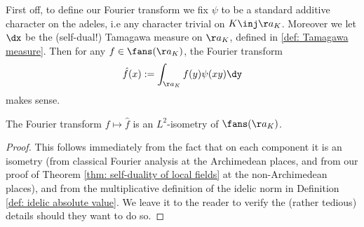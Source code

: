 \documentclass[11pt, x11names, openany]{book}
\begin{document}
First off, to define our Fourier transform we fix $\psi$ to be a standard additive character on the adeles, i.e any character trivial on $K \inj \aa_K$. Moreover we let $\dx$ be the (self-dual!) Tamagawa measure on $\aa_K$, defined in \ref{def: Tamagawa measure}. Then for any $f \in \fans(\aa_K)$, the Fourier transform 
\begin{equation}
    \label{eqn: fourier transform on A_K}
    \hat{f}(x) := \int_{\aa_K} f(y)\psi(xy) \dy 
\end{equation}
makes sense.

\begin{prop}
    \label{prop: fourier isometry of S(A_K)}
The Fourier transform $f \mapsto \hat{f}$ is an $L^2$-isometry of $\fans(\aa_K)$. 
\end{prop}
\begin{proof}
    This follows immediately from the fact that on each component it is an isometry (from classical Fourier analysis at the Archimedean places, and from our proof of Theorem \ref{thm: self-duality of local fields} at the non-Archimedean places), and from the multiplicative definition of the idelic norm in Definition \ref{def: idelic absolute value}. We leave it to the reader to verify the (rather tedious) details should they want to do so.
\end{proof}
\end{document}

